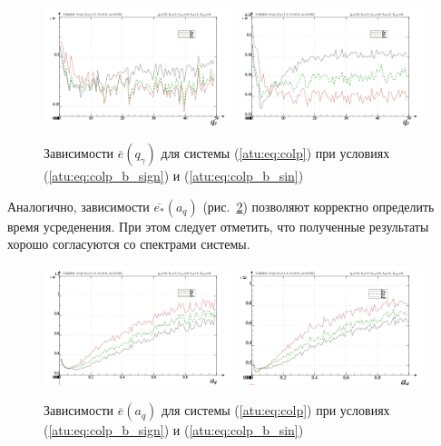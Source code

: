 \begin{figure}[htb!]
\centerline{
  \includegraphics[width=0.49\textwidth]{p/mod/colp_m5p-p_qg_e_sign.png}
  \includegraphics[width=0.49\textwidth]{p/mod/colp_m5p-p_qg_e_sin.png}
}
  \caption{Зависимости  $\overline{e}(q_\gamma)$ для системы (\ref{atu:eq:colp})
  при условиях (\ref{atu:eq:colp_b_sign}) и (\ref{atu:eq:colp_b_sin})
}
\label{atu:f:colp_e_qgamma}
\end{figure}



Аналогично, зависимости $\overline{e_*}(a_q)$ (рис.~\ref{atu:f:colp_e_a_q})
позволяют корректно определить время усреденения.
При этом следует отметить, что
полученные результаты хорошо согласуются со спектрами системы.

\begin{figure}[htb!]
\centerline{
  \includegraphics[width=0.49\textwidth]{p/mod/colp_m5p-p_a_q_e_sign.png}
  \includegraphics[width=0.49\textwidth]{p/mod/colp_m5p-p_a_q_e_sin.png}
}
  \caption{Зависимости  $\overline{e}(a_q)$ для системы (\ref{atu:eq:colp})
  при условиях (\ref{atu:eq:colp_b_sign}) и (\ref{atu:eq:colp_b_sin})
}
\label{atu:f:colp_e_a_q}
\end{figure}

